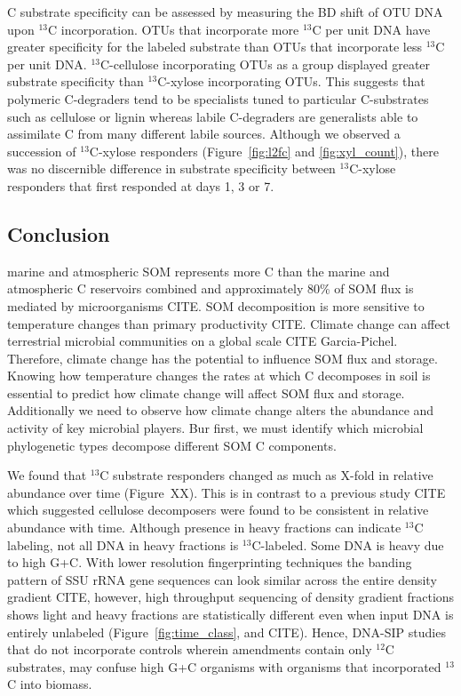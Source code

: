 C substrate specificity can be assessed by measuring the BD shift of OTU DNA
upon $^{13}$C incorporation. OTUs that incorporate more $^{13}$C per unit DNA
have greater specificity for the labeled substrate than OTUs that incorporate
less $^{13}$C per unit DNA. $^{13}$C-cellulose incorporating OTUs as a group
displayed greater substrate specificity than $^{13}$C-xylose incorporating
OTUs. This suggests that polymeric C-degraders tend to be specialists tuned to
particular C-substrates such as cellulose or lignin whereas labile C-degraders
are generalists able to assimilate C from many different labile sources.
Although we observed a succession of $^{13}$C-xylose responders
(Figure~\ref{fig:l2fc} and \ref{fig:xyl_count}), there was no discernible
difference in substrate specificity between $^{13}$C-xylose responders that
first responded at days 1, 3 or 7. 

\subsection{Conclusion} 
marine and atmospheric SOM represents more C than the marine and atmospheric
C reservoirs combined and approximately 80\% of SOM flux is mediated by
microorganisms CITE. SOM decomposition is more sensitive to temperature changes
than primary productivity CITE. Climate change can affect terrestrial microbial
communities on a global scale CITE Garcia-Pichel. Therefore, climate change has
the potential to influence SOM flux and storage. Knowing how temperature
changes the rates at which C decomposes in soil is essential to predict how
climate change will affect SOM flux and storage. Additionally we need to
observe how climate change alters the abundance and activity of key microbial
players. Bur first, we must identify which microbial phylogenetic types
decompose different SOM C components.

We found that $^{13}$C substrate responders changed as much as X-fold in
relative abundance over time (Figure~XX). This is in contrast to
a previous study CITE which suggested cellulose decomposers were found to
be consistent in relative abundance with time. Although presence in heavy
fractions can indicate $^{13}$C labeling, not all DNA in heavy fractions
is $^{13}$C-labeled. Some DNA is heavy due to high G+C.
With lower resolution fingerprinting techniques the banding pattern of SSU
rRNA gene sequences can look similar across the entire density gradient
CITE, however, high throughput sequencing of density gradient fractions
shows light and heavy fractions are statistically different even when
input DNA is entirely unlabeled (Figure~\ref{fig:time_class}, and CITE).
Hence, DNA-SIP studies that do not incorporate controls wherein amendments
contain only $^{12}$C substrates, may confuse high G+C organisms with
organisms that incorporated $^{13}$C into biomass. 

